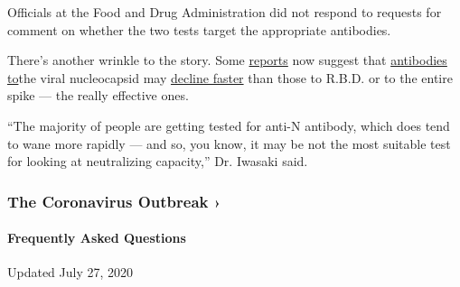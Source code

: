 Officials at the Food and Drug Administration did not respond to
requests for comment on whether the two tests target the appropriate
antibodies.

There's another wrinkle to the story. Some
\href{https://www.medrxiv.org/content/10.1101/2020.07.14.20153536v2?\%253fcollection=}{reports}
now suggest that
\href{https://www.nature.com/articles/s41591-020-0965-6}{antibodies
to}the viral nucleocapsid may
\href{https://www.medrxiv.org/content/10.1101/2020.07.16.20155663v2}{decline
faster} than those to R.B.D. or to the entire spike --- the really
effective ones.

``The majority of people are getting tested for anti-N antibody, which
does tend to wane more rapidly --- and so, you know, it may be not the
most suitable test for looking at neutralizing capacity,'' Dr. Iwasaki
said.

\href{https://www.nytimes.com/news-event/coronavirus?action=click\&pgtype=Article\&state=default\&region=MAIN_CONTENT_3\&context=storylines_faq}{}

\hypertarget{the-coronavirus-outbreak-}{%
\subsubsection{The Coronavirus Outbreak
›}\label{the-coronavirus-outbreak-}}

\hypertarget{frequently-asked-questions}{%
\paragraph{Frequently Asked
Questions}\label{frequently-asked-questions}}

Updated July 27, 2020

